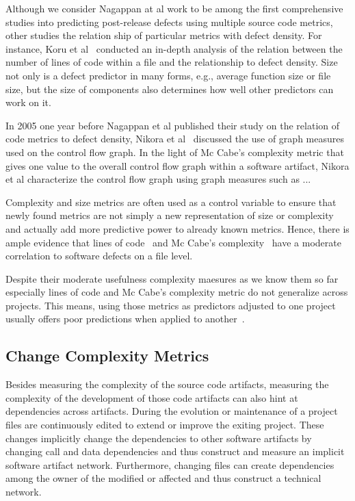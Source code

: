 Although we consider Nagappan at al work to be among the first comprehensive studies into predicting post-release defects using multiple source code metrics, other studies the relation ship of particular metrics with defect density.
For instance, Koru et al~\cite{koru:promise:2005} conducted an in-depth analysis of the relation between the number of lines of code within a file and the relationship to defect density.
Size not only is a defect predictor in many forms, e.g., average function size or file size, but the size of components also determines how well other predictors can work on it.

In 2005 one year before Nagappan et al published their study on the relation of code metrics to defect density, Nikora et al~\cite{nikora:metrics:2005} discussed the use of graph measures used on the control flow graph.
In the light of Mc Cabe's complexity metric that gives one value to the overall control flow graph within a software artifact, Nikora et al characterize the control flow graph using graph measures such as ...

Complexity and size metrics are often used as a control variable to ensure that newly found metrics are not simply a new representation of size or complexity and actually add more predictive power to already known metrics.
Hence, there is ample evidence that lines of code~\cite{shihab:esem:2010,arisholm:isese:2006,jiang:promise:2008,knab:msr:2006,zhang:icsm:2009} and Mc Cabe's complexity~\cite{nagappan:icse:2006,shihab:fse:2011,zimmermann:fse:2009,jiang:promise:2008,zimmermann:promise:2007} have a moderate correlation to software defects on a file level.

Despite their moderate usefulness complexity maesures as we know them so far especially lines of code and Mc Cabe's complexity metric do not generalize across projects.
This means, using those metrics as predictors adjusted to one project usually offers poor predictions when applied to another~\cite{zimmermann:fse:2009}. 


\subsection{Change Complexity Metrics}
Besides measuring the complexity of the source code artifacts, measuring the complexity of the development of those code artifacts can also hint at dependencies across artifacts.
During the evolution or maintenance of a project files are continuously edited to extend or improve the exiting project.
These changes implicitly change the dependencies to other software artifacts by changing call and data dependencies and thus construct and measure an implicit software artifact network.
Furthermore, changing files can create dependencies among the owner of the modified or affected and thus construct a technical network.

